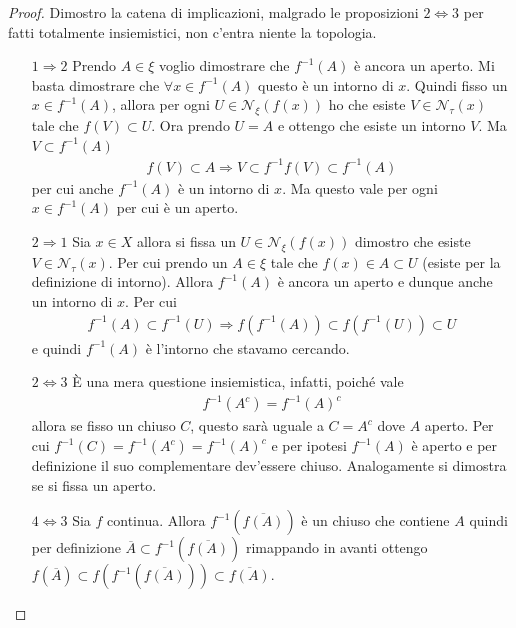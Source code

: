 \begin{proof}
	Dimostro la catena di implicazioni, malgrado le proposizioni $2 \Leftrightarrow 3$ per fatti totalmente insiemistici, non c'entra niente la topologia.
	\begin{enumerate}
		\item[$1 \Rightarrow 2$] Prendo $A \in \xi$ voglio dimostrare che $f^{-1}(A)$ è ancora un aperto. Mi basta dimostrare che $\forall x \in f^{-1}(A)$ questo è un intorno di $x$. Quindi fisso un $x \in f^{-1}(A)$, allora per ogni $U \in \mathcal{N}_\xi(f(x))$ ho che esiste $V \in \mathcal{N}_\tau(x)$ tale che $f(V) \subset U$. Ora prendo $U = A$ e ottengo che esiste un intorno $V$. Ma $V \subset f^{-1}(A)$
		\begin{equation}
		\begin{aligned}
			f(V) \subset A \Longrightarrow V \subset f^{-1}f(V) \subset f^{-1}(A)
		\end{aligned}
		\end{equation}
		per cui anche $f^{-1}(A)$ è un intorno di $x$. Ma questo vale per ogni $x \in f^{-1}(A)$ per cui è un aperto.
		\item[$2 \Rightarrow 1$] Sia $x \in X$ allora si fissa un $U \in \mathcal{N}_\xi(f(x))$ dimostro che esiste $V \in \mathcal{N}_\tau(x)$. Per cui prendo un $A \in \xi$ tale che $f(x) \in A \subset U$ (esiste per la definizione di intorno). Allora $f^{-1}(A)$ è ancora un aperto e dunque anche un intorno di $x$. Per cui 
		\begin{equation}
		\begin{aligned}
			f^{-1}(A) \subset f^{-1}(U) \Longrightarrow f(f^{-1}(A)) \subset f(f^{-1}(U)) \subset U
		\end{aligned}
		\end{equation}
		e quindi $f^{-1}(A)$ è l'intorno che stavamo cercando.
		\item[$2 \Leftrightarrow 3$] È una mera questione insiemistica, infatti, poiché vale 
		\begin{equation}
		\begin{aligned}
			f^{-1}(A^c) = f^{-1}(A)^c
		\end{aligned}
		\end{equation}
		allora se fisso un chiuso $C$, questo sarà uguale a $C = A^c$ dove $A$ aperto. Per cui $f^{-1}(C) = f^{-1}(A^c) = f^{-1}(A)^c$ e per ipotesi $f^{-1}(A)$ è aperto e per definizione il suo complementare dev'essere chiuso. Analogamente si dimostra se si fissa un aperto.
		\item[$4 \Leftrightarrow 3$] Sia $f$ continua. Allora $f^{-1}(\overline{f(A)})$ è un chiuso che contiene $A$ quindi per definizione $\overline{A} \subset f^{-1}(\overline{f(A)})$ rimappando in avanti ottengo 
		$f(\overline{A}) \subset f(f^{-1}(\overline{f(A)})) 
		\subset \overline{f(A)}$.\\
		

\end{enumerate}
\end{proof}
